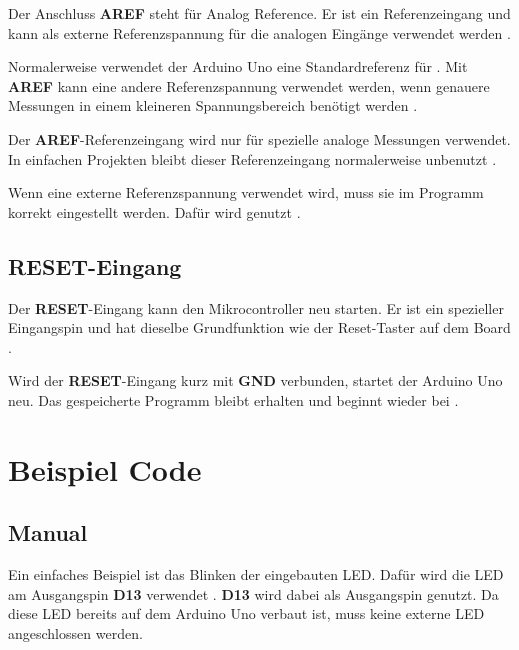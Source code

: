 Der Anschluss \textbf{AREF} steht für Analog Reference. Er ist ein Referenzeingang und kann als externe Referenzspannung für die analogen Eingänge verwendet werden \cite{arduino:uno-datasheet}.

Normalerweise verwendet der Arduino Uno eine Standardreferenz für . Mit \textbf{AREF} kann eine andere Referenzspannung verwendet werden, wenn genauere Messungen in einem kleineren Spannungsbereich benötigt werden \cite{arduino:analogread}.



Der \textbf{AREF}-Referenzeingang wird nur für spezielle analoge Messungen verwendet. In einfachen Projekten bleibt dieser Referenzeingang normalerweise unbenutzt \cite{arduino:uno-components}.

Wenn eine externe Referenzspannung verwendet wird, muss sie im Programm korrekt eingestellt werden. Dafür wird  genutzt \cite{arduino:analogread}.



\subsection{RESET-Eingang}



Der \textbf{RESET}-Eingang kann den Mikrocontroller neu starten. Er ist ein spezieller Eingangspin und hat dieselbe Grundfunktion wie der Reset-Taster auf dem Board \cite{arduino:uno-datasheet}\cite{arduino:uno-components}.



Wird der \textbf{RESET}-Eingang kurz mit \textbf{GND} verbunden, startet der Arduino Uno neu. Das gespeicherte Programm bleibt erhalten und beginnt wieder bei  \cite{arduino:uno-components}\cite{arduino:language-reference}.


\section{Beispiel Code}

\subsection{Manual}

Ein einfaches Beispiel ist das Blinken der eingebauten LED. Dafür wird die LED am Ausgangspin \textbf{D13} verwendet \cite{arduino:uno-components}. \textbf{D13} wird dabei als Ausgangspin genutzt. Da diese LED bereits auf dem Arduino Uno verbaut ist, muss keine externe LED angeschlossen werden.

